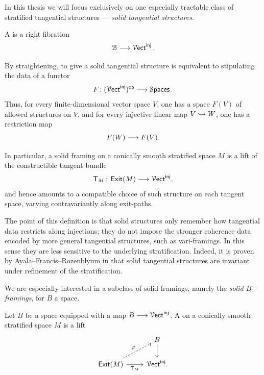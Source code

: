 In this thesis we will focus exclusively on one especially tractable class of stratified tangential structures — \emph{solid tangential structures}.

\begin{definition}\cite[Definition~2.35]{AFR2}
    A  is a right fibration
    \begin{equation}
        \mathcal B \longrightarrow \operatorname{\mathcal V{\sf ect}}^{\sf inj}.
    \end{equation}
\end{definition}

By straightening, to give a solid tangential structure is equivalent to stipulating the data of a functor
\begin{equation}
    F \colon (\operatorname{\mathcal V{\sf ect}}^{\sf inj})^{\mathsf{op}} \longrightarrow \operatorname{\mathcal S\mathsf{paces}}.
\end{equation}
Thus, for every finite-dimensional vector space $V$, one has a space $F(V)$ of allowed structures on $V$, and for every injective linear map $V \hookrightarrow W$, one has a restriction map
\begin{equation}
    F(W) \longrightarrow F(V).
\end{equation}

In particular, a solid framing on a conically smooth stratified space $M$ is a lift of the constructible tangent bundle
\begin{equation}
    \mathsf T_M \colon \operatorname{\sf Exit}(M) \longrightarrow \operatorname{\mathcal V{\sf ect}}^{\sf inj},
\end{equation}
and hence amounts to a compatible choice of such structure on each tangent space, varying contravariantly along exit-paths.

The point of this definition is that solid structures only remember how tangential data restricts along injections; they do not impose the stronger coherence data encoded by more general tangential structures, such as vari-framings. In this sense they are less sensitive to the underlying stratification. Indeed, it is proven by Ayala--Francis--Rozenblyum in \cite[Proposition~2.61]{AFR2} that solid tangential structures are invariant under refinement of the stratification.

We are especially interested in a subclass of solid framings, namely the \emph{solid $B$-framings}, for $B$ a space.

\begin{definition}
    Let $B$ be a space equipped with a map $B \longrightarrow \operatorname{\mathcal V{\sf ect}}^{\operatorname{\mathsf{inj}}}$. A  on a conically smooth stratified space $M$ is a lift
    \begin{equation}
    \begin{tikzcd}[ampersand replacement=\&]
        \& B \\
        {\exit(M)} \& {\Vect^{\inj}}.
        \arrow[from=1-2, to=2-2]
        \arrow["\varphi", dashed, from=2-1, to=1-2]
        \arrow["{\sT_M}"', from=2-1, to=2-2]
    \end{tikzcd}
    \end{equation}
\end{definition}

